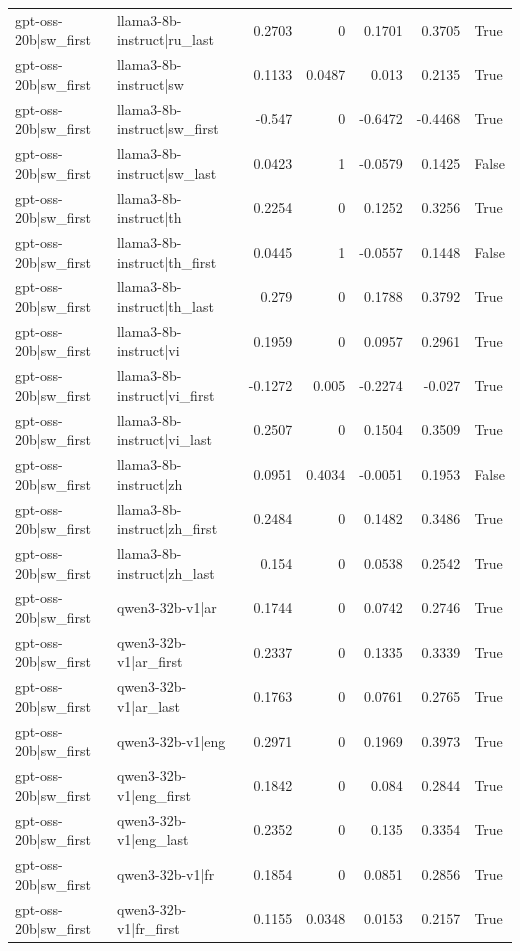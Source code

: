 \begin{table}
\begin{tabular}{l l r r r r l}
gpt-oss-20b|sw_first & llama3-8b-instruct|ru_last & 0.2703 & 0 & 0.1701 & 0.3705 & True \\
gpt-oss-20b|sw_first & llama3-8b-instruct|sw & 0.1133 & 0.0487 & 0.013 & 0.2135 & True \\
gpt-oss-20b|sw_first & llama3-8b-instruct|sw_first & -0.547 & 0 & -0.6472 & -0.4468 & True \\
gpt-oss-20b|sw_first & llama3-8b-instruct|sw_last & 0.0423 & 1 & -0.0579 & 0.1425 & False \\
gpt-oss-20b|sw_first & llama3-8b-instruct|th & 0.2254 & 0 & 0.1252 & 0.3256 & True \\
gpt-oss-20b|sw_first & llama3-8b-instruct|th_first & 0.0445 & 1 & -0.0557 & 0.1448 & False \\
gpt-oss-20b|sw_first & llama3-8b-instruct|th_last & 0.279 & 0 & 0.1788 & 0.3792 & True \\
gpt-oss-20b|sw_first & llama3-8b-instruct|vi & 0.1959 & 0 & 0.0957 & 0.2961 & True \\
gpt-oss-20b|sw_first & llama3-8b-instruct|vi_first & -0.1272 & 0.005 & -0.2274 & -0.027 & True \\
gpt-oss-20b|sw_first & llama3-8b-instruct|vi_last & 0.2507 & 0 & 0.1504 & 0.3509 & True \\
gpt-oss-20b|sw_first & llama3-8b-instruct|zh & 0.0951 & 0.4034 & -0.0051 & 0.1953 & False \\
gpt-oss-20b|sw_first & llama3-8b-instruct|zh_first & 0.2484 & 0 & 0.1482 & 0.3486 & True \\
gpt-oss-20b|sw_first & llama3-8b-instruct|zh_last & 0.154 & 0 & 0.0538 & 0.2542 & True \\
gpt-oss-20b|sw_first & qwen3-32b-v1|ar & 0.1744 & 0 & 0.0742 & 0.2746 & True \\
gpt-oss-20b|sw_first & qwen3-32b-v1|ar_first & 0.2337 & 0 & 0.1335 & 0.3339 & True \\
gpt-oss-20b|sw_first & qwen3-32b-v1|ar_last & 0.1763 & 0 & 0.0761 & 0.2765 & True \\
gpt-oss-20b|sw_first & qwen3-32b-v1|eng & 0.2971 & 0 & 0.1969 & 0.3973 & True \\
gpt-oss-20b|sw_first & qwen3-32b-v1|eng_first & 0.1842 & 0 & 0.084 & 0.2844 & True \\
gpt-oss-20b|sw_first & qwen3-32b-v1|eng_last & 0.2352 & 0 & 0.135 & 0.3354 & True \\
gpt-oss-20b|sw_first & qwen3-32b-v1|fr & 0.1854 & 0 & 0.0851 & 0.2856 & True \\
gpt-oss-20b|sw_first & qwen3-32b-v1|fr_first & 0.1155 & 0.0348 & 0.0153 & 0.2157 & True \\

\end{tabular}
\end{table}
